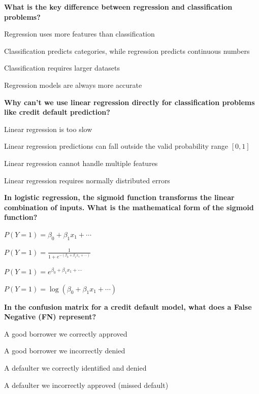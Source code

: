 \documentclass[11pt]{article}
\begin{document}
\begin{questions}

\item \textbf{What is the key difference between regression and classification problems?}
\begin{options}
  \item Regression uses more features than classification
  \item Classification predicts categories, while regression predicts continuous numbers
  \item Classification requires larger datasets
  \item Regression models are always more accurate
\end{options}

\item \textbf{Why can't we use linear regression directly for classification problems like credit default prediction?}
\begin{options}
  \item Linear regression is too slow
  \item Linear regression predictions can fall outside the valid probability range $[0, 1]$
  \item Linear regression cannot handle multiple features
  \item Linear regression requires normally distributed errors
\end{options}

\item \textbf{In logistic regression, the sigmoid function transforms the linear combination of inputs. What is the mathematical form of the sigmoid function?}
\begin{options}
  \item $P(Y=1) = \beta_0 + \beta_1 x_1 + \cdots$
  \item $P(Y=1) = \frac{1}{1 + e^{-(\beta_0 + \beta_1 x_1 + \cdots)}}$
  \item $P(Y=1) = e^{\beta_0 + \beta_1 x_1 + \cdots}$
  \item $P(Y=1) = \log(\beta_0 + \beta_1 x_1 + \cdots)$
\end{options}

\item \textbf{In the confusion matrix for a credit default model, what does a False Negative (FN) represent?}
\begin{options}
  \item A good borrower we correctly approved
  \item A good borrower we incorrectly denied
  \item A defaulter we correctly identified and denied
  \item A defaulter we incorrectly approved (missed default)
\end{options}


\end{questions}
\end{document}
